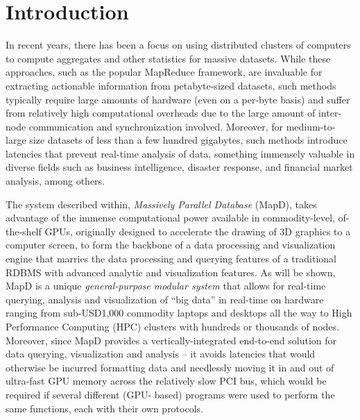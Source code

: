 \documentclass[twocolumn]{article}
\newcommand*\DNA{\textsc{dna}}
\newcommand*\Let[2]{\State #1 $\gets$ #2}
\begin{document}
\section{Introduction}
In recent years, there has been a focus on using distributed clusters of computers to compute aggregates and other statistics for massive datasets. 
While these approaches, such as the popular MapReduce framework, are invaluable for extracting actionable information from petabyte-sized datasets, such methods typically require large amounts of hardware (even on a per-byte basis) and suffer from relatively high computational overheads due to the large amount of inter-node communication and synchronization involved. 
Moreover, for medium-to-large size datasets of less than a few hundred gigabytes, such methods introduce latencies that prevent real-time analysis of data, something immensely valuable in diverse fields such as business intelligence, disaster response, and financial market analysis, among others.

The system described within, \textit{Massively Parallel Database} (MapD), takes advantage of the immense computational power available in commodity-level, of-the-shelf GPUs, originally designed to accelerate the drawing of 3D graphics to a computer screen, to form the backbone of a data processing and visualization engine that marries the data processing and querying features of a traditional RDBMS with advanced analytic and visualization features. 
As will be shown, MapD is a unique \textit{general-purpose modular system} that allows for real-time querying, analysis and visualization of “big data” in real-time on hardware ranging from sub-USD1,000 commodity laptops and desktops all the way to High Performance Computing (HPC) clusters with hundreds or thousands of nodes. Moreover, since MapD provides a vertically-integrated end-to-end solution for data querying, visualization and analysis – it avoids latencies that would otherwise be incurred formatting data and needlessly moving it in and out of ultra-fast GPU memory across the relatively slow PCI bus, which would be required if several different (GPU- based) programs were used to perform the same functions, each with their own protocols.

\end{document}

